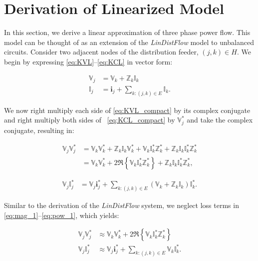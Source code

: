 \section{Derivation of Linearized Model}

\setlength{\abovedisplayskip}{-0pt}
\setlength{\belowdisplayskip}{-0pt}

In this section, we derive a linear approximation of three phase power flow.  This model can be thought of as an extension of the \emph{LinDistFlow} model to unbalanced circuits.  Consider two adjacent nodes of the distribution feeder, $(j,k) \in H$.  We begin by expressing \eqref{eq:KVL}--\eqref{eq:KCL} in vector form:

\begin{align}
	\mathbb{V}_{j} &= \mathbb{V}_{k} + \mathbb{Z}_{k} \mathbb{I}_{k} \label{eq:KVL_compact} \\
    \mathbb{I}_{j} &=  \mathbf{i}_{j}+ \sum_{k:(j,k)\in E}\mathbb{I}_{k} \label{eq:KCL_compact}.
\end{align}

We now right multiply each side of \eqref{eq:KVL_compact} by its complex conjugate and right multiply both sides of ~\eqref{eq:KCL_compact} by $\mathbb{V}_{j}^{*}$ and take the complex conjugate, resulting in:

\begin{align}
	\mathbb{V}_{j} \mathbb{V}_{j}^*  & =  \mathbb{V}_{k} \mathbb{V}_{k}^* + \mathbb{Z}_{k} \mathbb{I}_{k} \mathbb{V}_{k}^* + \mathbb{V}_{k} \mathbb{I}_{k}^{*} \mathbb{Z}_{k}^{*} + \mathbb{Z}_{k} \mathbb{I}_{k} \mathbb{I}_{k}^{*} \mathbb{Z}_{k}^{*} \nonumber \\
    & = \mathbb{V}_{k} \mathbb{V}_{k}^* + 2 \Re \left\{\mathbb{V}_{k} \mathbb{I}_{k}^{*} \mathbb{Z}_{k}^{*} \right\} + \mathbb{Z}_{k} \mathbb{I}_{k} \mathbb{I}_{k}^{*} \mathbb{Z}_{k}^{*}
\label{eq:mag_1},
\end{align}


\begin{align}
	\mathbb{V}_{j}\mathbb{I}_{j}^{*} &= \mathbb{V}_{j}\mathbf{i}_{j}^{*} + \sum_{k:(j,k) \in E} \left(\mathbb{V}_{k} + \mathbb{Z}_{k}\mathbb{I}_{k}\right)\mathbb{I}_{k}^{*} \label{eq:pow_1}.
\end{align}

Similar to the derivation of the \emph{LinDistFlow} system, we neglect loss terms in \eqref{eq:mag_1}--\eqref{eq:pow_1}, which yields:

\begin{align}
    \mathbb{V}_{j}\mathbb{V}_{j}^{*} &\approx \mathbb{V}_{k} \mathbb{V}_{k}^* + 2 \Re \left\{\mathbb{V}_{k} \mathbb{I}_{k}^{*} \mathbb{Z}_{k}^{*} \right\} \label{eq:mag_2} \\
	\mathbb{V}_{j}\mathbb{I}_{j}^{*} &\approx \mathbb{V}_{j}\mathbf{i}_{j}^{*} + \sum_{k:(j,k) \in E} \mathbb{V}_{k}\mathbb{I}_{k}^{*} \label{eq:pow_2}.
\end{align}

